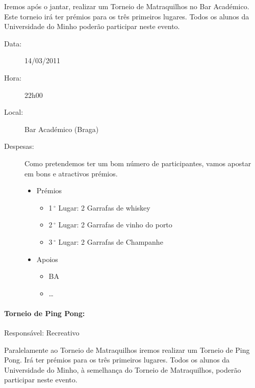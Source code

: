 Iremos após o jantar, realizar um Torneio de Matraquilhos no Bar Académico. Este torneio irá ter prémios para os três primeiros lugares. Todos os alunos da Universidade do Minho poderão participar neste evento.

\begin{description}
	\item[Data:] 14/03/2011
	\item[Hora:] 22h00
	\item[Local:] Bar Académico (Braga)
	\item[Despesas:] Como pretendemos ter um bom número de participantes, vamos apostar em bons e atractivos prémios.
	\begin{itemize}
		\item Prémios
		\begin{itemize}
			\item 1$\,^{\circ}$ Lugar: 2 Garrafas de whiskey
			\item 2$\,^{\circ}$ Lugar: 2 Garrafas de vinho do porto
			\item 3$\,^{\circ}$ Lugar: 2 Garrafas de Champanhe
		\end{itemize}
		\item Apoios
		\begin{itemize}
			\item BA
			\item \dots  
		\end{itemize}
	\end{itemize}
\end{description}

\paragraph{Torneio de Ping Pong:}
Responsável: Recreativo

Paralelamente ao Torneio de Matraquilhos iremos realizar um Torneio de Ping Pong. Irá ter prémios para os três primeiros lugares. Todos os alunos da Universidade do Minho, à semelhança do Torneio de Matraquilhos, poderão participar neste evento.

